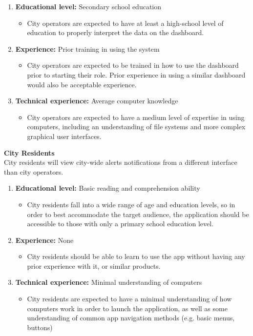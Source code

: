 \documentclass[]{article}
\begin{document}
\begin{enumerate}
	\item \textbf{Educational level:} Secondary school education
		\begin{itemize}
			\item City operators are expected to have at least a high-school level of education to properly interpret the data on the dashboard.
		\end{itemize}
	\item \textbf{Experience:} Prior training in using the system
		\begin{itemize}
			\item City operators are expected to be trained in how to use the dashboard prior to starting their role. Prior experience in using a similar dashboard would also be acceptable experience.
		\end{itemize}
	\item \textbf{Technical experience:} Average computer knowledge
		\begin{itemize}
			\item City operators are expected to have a medium level of expertise in using computers, including an understanding of file systems and more complex graphical user interfaces.
		\end{itemize}
\end{enumerate}
\textbf{City Residents}\\
City residents will view city-wide alerts notifications from a different interface than city operators.
\begin{enumerate}
	\item \textbf{Educational level:} Basic reading and comprehension ability
		\begin{itemize}
			\item City residents fall into a wide range of age and education levels, so in order to best accommodate the target audience, the application should be accessible to those with only a primary school education level. 
		\end{itemize}
	\item \textbf{Experience:} None
		\begin{itemize}
			\item City residents should be able to learn to use the app without having any prior experience with it, or similar products. 
		\end{itemize}
	\item \textbf{Technical experience:} Minimal understanding of computers
		\begin{itemize}
			\item City residents are expected to have a minimal understanding of how computers work in order to launch the application, as well as some understanding of common app navigation methods (e.g. basic menus, buttons)
		\end{itemize}
\end{enumerate}
\end{document}
